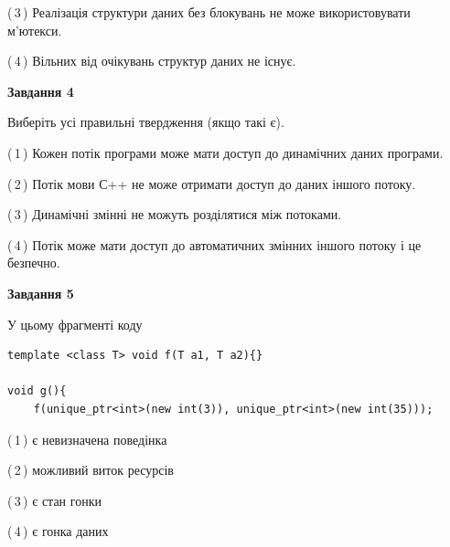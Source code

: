 \documentclass[12pt, ukrainian]{article}
\begin{document}
\begin {large}
{(\,3\,) Реалізація структури даних без блокувань не може використовувати м’ютекси.%

(\,4\,) Вільних від очікувань структур даних не існує.%



\begin{center}
\textbf{Завдання 4}
\end{center}
Виберіть усі правильні твердження (якщо такі є).\par
\vspace{2mm}

(\,1\,) Кожен потік програми може мати доступ до динамічних даних програми.%

(\,2\,) Потік мови С++ не може отримати доступ до даних іншого потоку.%

(\,3\,) Динамічні змінні не можуть розділятися між потоками.%

(\,4\,) Потік може мати доступ до автоматичних змінних іншого потоку і це безпечно.%



\begin{center}
\textbf{Завдання 5}
\end{center}
У цьому фрагменті коду
\begin{verbatim}
template <class T> void f(T a1, T a2){}

void g(){
    f(unique_ptr<int>(new int(3)), unique_ptr<int>(new int(35)));
\end{verbatim}

(\,1\,) є невизначена поведінка%

(\,2\,) можливий виток ресурсів%

(\,3\,) є стан гонки%

(\,4\,) є гонка даних%


}
\end {large}
\end{document}
